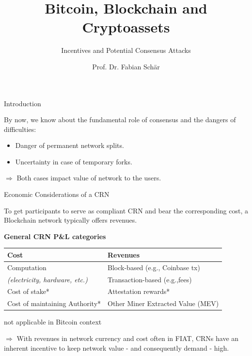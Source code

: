 \documentclass[]{beamer}
\title{Bitcoin, Blockchain and Cryptoassets}
\subtitle{Incentives and Potential Consensus Attacks}
\author{Prof. Dr. Fabian Schär}
\institute{University of Basel}
\begin{document}
\thispagestyle{empty}
\begin{frame}[noframenumbering]
	\titlepage
\end{frame}

\begin{frame}{Introduction}

By now, we know about the fundamental role of consensus and the dangers of difficulties:
	\begin{itemize}
		\item Danger of permanent network splits.
		\item Uncertainty in case of temporary forks.
	\end{itemize}
	
\vspace{0.5 em}
$\Rightarrow$ Both cases impact value of network to the users.

\vspace{1.5 em}

\end{frame}

\begin{frame}{Economic Considerations of a CRN}

To get participants to serve as compliant CRN and bear the corresponding cost, a Blockchain network typically offers revenues.

\vspace{1 em}

\footnotesize
\textbf{General CRN P\&L categories}
\begin{table}
	{\renewcommand{\arraystretch}{1.3}%
  \center
  \begin{tabular}[]{p{} | p{}}
		\textbf{Cost} & \textbf{Revenues}      \\
		\hline
		Computation & Block-based (e.g., Coinbase tx)\\
		\textit{(electricity, hardware, etc.)} & Transaction-based (e.g.,fees)\\
		Cost of stake* & Attestation rewards*\\
		Cost of maintaining Authority* & Other Miner Extracted Value (MEV)
  \end{tabular}}
\end{table}

\scriptsize *not applicable in Bitcoin context

\vspace{1 em}
\normalsize
$\Rightarrow$ With revenues in network currency and cost often in FIAT, CRNs have an inherent incentive to keep network value - and consequently demand - high.
	
\end{frame}
\end{document}
